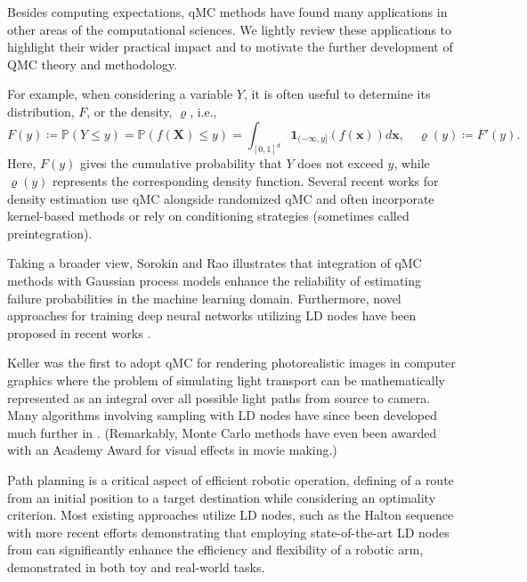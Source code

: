 \documentclass{svproc}
\newcounter{algorithm}%
\begin{document}
Besides computing expectations, qMC methods have found many applications in other areas of the computational sciences. We lightly review these applications to highlight their wider practical impact and to motivate the further development of QMC theory and methodology.

For example, when considering a variable $Y$, it is often useful to determine its distribution, $F$, or the density, $\varrho$, i.e., 
\[
F(y) \coloneqq \mathbb{P}(Y\leq y)=\mathbb{P}(f(\mathbf{X})\leq y)=\int_{[0,1]^d} \mathbf{1}_{(-\infty,y]}(f(\mathbf{x}))d\mathbf{x}, \quad \varrho(y)\coloneqq F'(y).
\]
Here, $F(y)$ gives the cumulative probability that $Y$ does not exceed $y$, while $\varrho(y)$ represents the corresponding density function. Several recent works for density estimation use qMC \cite{LEcPuc20a,LEcuyer2022b,GilKuoSlo23a} alongside randomized qMC \cite{AbdEtal21a} and often incorporate kernel-based methods or rely on conditioning strategies (sometimes called preintegration).



Taking a broader view, Sorokin and Rao \cite{SorRao23a} illustrates that integration of qMC methods with Gaussian process models enhance the reliability of estimating failure probabilities in the machine learning domain. Furthermore, novel approaches for training deep neural networks utilizing LD nodes have been proposed in recent works \cite{longo21,mishra21}.

Keller \cite{kell95} was the first to adopt qMC for rendering photorealistic images in computer graphics where the problem of simulating light transport can be mathematically represented as an integral over all possible light paths from source to camera. Many algorithms involving sampling with LD nodes have since been developed much further in \cite{kellprem12,shired08,Keller2013a,kolkel00,kell96,kell95}. (Remarkably, Monte Carlo methods have even been awarded with an Academy Award for visual effects in movie making.)

Path planning is a critical aspect of efficient robotic operation, defining of a route from an initial position to a target destination while considering an optimality criterion. Most existing approaches utilize LD nodes, such as the Halton sequence \cite{veldel14,zhong24} with more recent efforts \cite{chahine24} demonstrating that employing state-of-the-art LD nodes from \cite{ruschkirk24} can significantly enhance the efficiency and flexibility of a robotic arm, demonstrated in both toy and real-world tasks.
\end{document}
